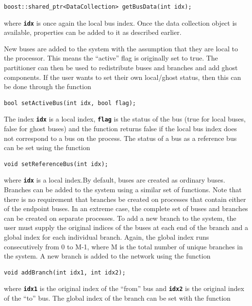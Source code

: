 \documentclass[12pt]{report} %
\begin{document}
{
\color{red}
\begin{Verbatim}[fontseries=b]
boost::shared_ptr<DataCollection> getBusData(int idx);
\end{Verbatim}
}

where \texttt{\textbf{idx}} is once again the local bus index. Once the data collection object is available, properties can be added to it as described earlier.

New buses are added to the system with the assumption that they are local to the processor. This means the ``active'' flag is originally set to true. The partitioner can then be used to redistribute buses and branches and add ghost components. If the user wants to set their own local/ghost status, then this can be done through the function

{
\color{red}
\begin{Verbatim}[fontseries=b]
bool setActiveBus(int idx, bool flag);
\end{Verbatim}
}

The index \texttt{\textbf{idx}} is a local index, \texttt{\textbf{flag}} is the status of the bus (true for local buses, false for ghost buses) and the function returns false if the local bus index does not correspond to a bus on the process.
The status of a bus as a reference bus can be set using the function

{
\color{red}
\begin{Verbatim}[fontseries=b]
void setReferenceBus(int idx);
\end{Verbatim}
}

where \texttt{\textbf{idx}} is a local index.By default, buses are created as ordinary buses.
Branches can be added to the system using a similar set of functions. Note that there is no requirement that branches be created on processes that contain either of the endpoint buses. In an extreme case, the complete set of buses and branches can be created on separate processes. To add a new branch to the system, the user must supply the original indices of the buses at each end of the branch and a global index for each individual branch. Again, the global index runs consecutively from 0 to M-1, where M is the total number of unique branches in the system. A new branch is added to the network using the function

{
\color{red}
\begin{Verbatim}[fontseries=b]
void addBranch(int idx1, int idx2);
\end{Verbatim}
}

where \texttt{\textbf{idx1}} is the original index of the ``from'' bus and \texttt{\textbf{idx2}} is the original index of the ``to'' bus. The global index of the branch can be set with the function
\end{document}
